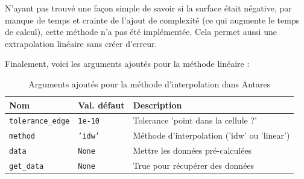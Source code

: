 N'ayant pas trouvé une façon simple de savoir si la surface était négative, par manque de temps et crainte de l'ajout de complexité (ce qui augmente le temps de calcul), cette méthode n'a pas été implémentée.
Cela permet aussi une extrapolation linéaire sans créer d'erreur.


Finalement, voici les arguments ajoutés pour la méthode linéaire :

\label{arguments_ajoutes}
\begin{table}[ht]
    \centering
    \begin{tabular}{|l|l|l|}
    \hline
    \textbf{Nom} & \textbf{Val. défaut} & \textbf{Description} \\ \hline %

    \texttt{tolerance\_edge} & \texttt{1e-10} & Tolerance 'point dans la cellule ?' \\
    \texttt{method} & \texttt{'idw'} & Méthode d'interpolation ('idw' ou 'linear') \\
    \texttt{data} & \texttt{None} & Mettre les données pré-calculées \\
    \texttt{get\_data} & \texttt{None} & True pour récupérer des données \\ \hline
    \end{tabular}
    \caption{Arguments ajoutés pour la méthode d'interpolation dans Antares}
    \label{tab:arguments_interpolation2}
\end{table}

